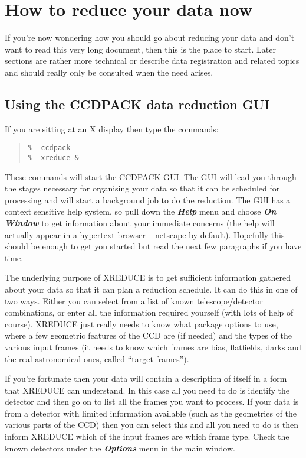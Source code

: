 \documentclass[twoside,11pt]{article}
\newcommand{\htmlref}[2]{#1}
\newcommand{\xlabel}[1]{}
\renewcommand{\_}{\texttt{\symbol{95}}}
\newenvironment{myquote}{\begin{quote}\begin{small}}{\end{small}\end{quote}}
\newcommand{\menu}[1]{{\small \bf \em #1}}
\newcommand{\routine}[1]{{\sc #1}}
\newcommand{\xroutine}[1]{\htmlref{{\sc #1}}{#1}}
\begin{document}
\section{How to reduce your data now}

If you're now wondering how you should go about reducing your data and
don't want to read this very long document, then this is the place to
start. Later sections are rather more technical or describe data
registration and related topics and should really only be consulted
when the need arises.

\subsection{Using the CCDPACK data reduction GUI \xlabel{usingxreduce}}

If you are sitting at an X display then type the commands:
\begin{myquote}
\begin{verbatim}
%  ccdpack
%  xreduce &
\end{verbatim}
\end{myquote}
These commands will start the CCDPACK GUI.  The GUI will lead you
through the stages necessary for organising your data so that it can
be scheduled for processing and will start a background job to do the
reduction.  The GUI has a context sensitive help system, so pull down
the \menu{Help} menu and choose \menu{On Window} to get information
about your immediate concerns (the help will actually appear in a
hypertext browser -- netscape by default). Hopefully this should be
enough to get you started but read the next few paragraphs if you have
time.

The underlying purpose of \xroutine{XREDUCE} is to get sufficient
information gathered about your data so that it can plan a reduction
schedule. It can do this in one of two ways. Either you can select
from a list of known telescope/detector combinations, or enter
all the information required yourself (with lots of help of course).
\routine{XREDUCE} just really needs to know what package options to
use, where a few geometric features of the CCD are (if needed) and the
types of the various input frames (it needs to know which frames are
bias, flatfields, darks and the real astronomical ones, called
``target frames'').

If you're fortunate then your data will contain a description of
itself in a form that \routine{XREDUCE} can understand. In this case
all you need to do is identify the detector and then go on to list all
the frames you want to process. If your data is from a detector with
limited information available (such as the geometries of the various
parts of the CCD) then you can select this and all you need to do is
then inform \routine{XREDUCE} which of the input frames are which frame
type. Check the known detectors under the \menu{Options} menu in the
main window.
\end{document}
